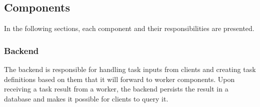 %	


\subsection{Components}

In the following sections, each component and their responsibilities are presented.

\subsubsection{Backend} \label{design-backend}

%

The backend is responsible for handling task inputs from clients and creating task definitions based on them that it will forward to worker components. Upon receiving a task result from a worker, the backend persists the result in a database and makes it possible for clients to query it.

